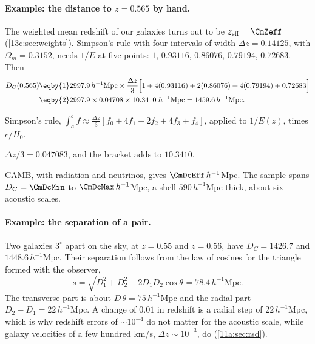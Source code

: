 \paragraph{Example: the distance to $z=0.565$ by hand.}
The weighted mean redshift of our galaxies turns out to be $z_{\mathrm{eff}}=\CmZeff$
(\cref{13c:sec:weights}). Simpson's rule with four intervals of width $\Delta
z=0.14125$, with $\Omega_m=0.3152$, needs $1/E$ at five points:
$1$, $0.93116$, $0.86076$, $0.79194$, $0.72683$. Then
\begin{align*}
  D_C(0.565)
  &\eqby{1}2997.9\,h^{-1}\mathrm{Mpc}\times\frac{\Delta z}{3}
    \Bigl[1+4(0.93116)+2(0.86076)+4(0.79194)+0.72683\Bigr]\\
  &\eqby{2}2997.9\times0.04708\times10.3410\;h^{-1}\mathrm{Mpc}
   =1459.6\,h^{-1}\mathrm{Mpc}.
\end{align*}
\begin{explain}
  \item Simpson's rule, $\int_a^bf\approx\frac{\Delta z}{3}[f_0+4f_1+2f_2+4f_3+f_4]$,
        applied to $1/E(z)$, times $c/H_0$.
  \item $\Delta z/3=0.047083$, and the bracket adds to $10.3410$.
\end{explain}
CAMB, with radiation and neutrinos, gives $\CmDcEff\,h^{-1}$Mpc. The sample spans
$D_C=\CmDcMin$ to $\CmDcMax\,h^{-1}$Mpc, a shell $590\,h^{-1}$Mpc thick, about six
acoustic scales.

\paragraph{Example: the separation of a pair.}
Two galaxies $3^\circ$ apart on the sky, at $z=0.55$ and $z=0.56$, have
$D_C=1426.7$ and $1448.6\,h^{-1}$Mpc. Their separation follows from the law of
cosines for the triangle formed with the observer,
\begin{equation*}
  s=\sqrt{D_1^2+D_2^2-2D_1D_2\cos\theta}=78.4\,h^{-1}\mathrm{Mpc}.
\end{equation*}
The transverse part is about $D\,\theta=75\,h^{-1}$Mpc and the radial part
$D_2-D_1=22\,h^{-1}$Mpc. A change of $0.01$ in redshift is a radial step of
$22\,h^{-1}$Mpc, which is why redshift errors of $\sim10^{-4}$ do not matter for
the acoustic scale, while galaxy velocities of a few hundred km/s, $\Delta z\sim
10^{-3}$, do (\cref{11a:sec:rsd}).

